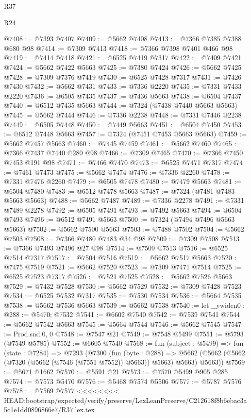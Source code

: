 \begin{lexlean}{R37}
\begin{lexlean}{R24}
\begin{coremodule}
{{{{{{{{{{{{{{{{{{{{{{{{{{{{{{{{{{{{{{{{{{{{{{{{{{{{{{{{{{{{{{{{{{{{{{{{{{{{{{{{{{{{{{{{{{{{{{{{{{{{{{{{{{{{{{{{{{{{{{{{{{{{{{{{{{{{{{{{{{{{{{{{{{{{{{{{{{{{{{{{{{{{{{{{{{{{{{{{{{{{{{{{{@7408 := @7393 @7407
@7409 := @5662 @7408
@7413 := @7366 @7385 @7388 @680 @98
@7414 := @7309 @7413
@7418 := @7366 @7398 @7401 @466 @98
@7419 := @7414 @7418
@7421 := @6525 @7419 @7317
@7422 := @7409 @7421
@7424 := @5662 @7422 @5663
@7425 := @7380 @7424
@7426 := @5662 @7425
@7428 := @7309 @7376 @7419
@7430 := @6525 @7428 @7317
@7431 := @7426 @7430
@7432 := @5662 @7431
@7433 := @7336 @2220
@7435 := @7331 @7433 @2220
@7436 := @6505 @7435
@7437 := @7436 @5663
@7438 := @6504 @7437
@7440 := @6512 @7435 @5663
@7444 := @7324 (@7438 @7440 @5663 @5663)
@7445 := @5662 @7444
@7446 := @7336 @2238
@7448 := @7331 @7446 @2238
@7449 := @6505 @7448
@7450 := @7449 @5663
@7451 := @6504 @7450
@7453 := @6512 @7448 @5663
@7457 := @7324 (@7451 @7453 @5663 @5663)
@7459 := @5662 @7457 @5663
@7460 := @7445 @7459
@7461 := @5662 @7460
@7465 := @7366 @7437 @7440 @280 @98
@7466 := @7309 @7465
@7470 := @7366 @7450 @7453 @191 @98
@7471 := @7466 @7470
@7473 := @6525 @7471 @7317
@7474 := @7461 @7473
@7475 := @5662 @7474
@7476 := @7336 @2260
@7478 := @7331 @7476 @2260
@7479 := @6505 @7478
@7480 := @7479 @5663
@7481 := @6504 @7480
@7483 := @6512 @7478 @5663
@7487 := @7324 (@7481 @7483 @5663 @5663)
@7488 := @5662 @7487
@7489 := @7336 @2278
@7491 := @7331 @7489 @2278
@7492 := @6505 @7491
@7493 := @7492 @5663
@7494 := @6504 @7493
@7496 := @6512 @7491 @5663
@7500 := @7324 (@7494 @7496 @5663 @5663)
@7502 := @5662 @7500 @5663
@7503 := @7488 @7502
@7504 := @5662 @7503
@7508 := @7366 @7480 @7483 @34 @98
@7509 := @7309 @7508
@7513 := @7366 @7493 @7496 @27 @98
@7514 := @7509 @7513
@7516 := @6525 @7514 @7317
@7517 := @7504 @7516
@7519 := @5662 @7517 @5663
@7520 := @7475 @7519
@7521 := @5662 @7520
@7523 := @7309 @7471 @7514
@7525 := @6525 @7523 @7317
@7526 := @7521 @7525
@7528 := @5662 @7526 @5663
@7529 := @7432 @7528
@7530 := @5662 @7529
@7532 := @7309 @7428 @7523
@7534 := @6525 @7532 @7317
@7535 := @7530 @7534
@7536 := @5664 @7535
@7538 := @5662 @7536 @5663
@7539 := @5662 @7538
@7540 := let _ywiden0 : @288 := @5470; @7532
@7541 := @6602 @7540
@7542 := @7539 @7541
@7544 := @5662 @7542 @5663
@7545 := @5664 @7544
@7546 := @5662 @7545
@7547 := Prod.snd.{0, 0}
@7548 := @7547 @21
@7549 := @7548 @5499
@7551 := @5793 (@7549 @5785)
@7552 := @6605 @7540
@7568 := fun (subject : @5499) =>
  fun (state : @7284) =>
  @7293
    (@7300
      (fun (byte : @288) =>
      @5662 (@5662 (@5662 (@7320 (@5662 (@7546 (@7551 @7552)) @5663)) @5663) @5663) @5663))
@7569 := @5671 @1662
@7570 := @5591 @21
@7573 := @7570 @5499 @905 @285
@7574 := @7573 @5470
@7576 := @5468 @7574 @5506
@7577 := @5787 @7576
@7578 := @7569 @7577
<<<<<<<< HEAD:bootstrap/expected/verify/preserve/LexLeanPreserve/C212618f8b6ebac3a5c1e1dd0896866e7/R37.lex.tex
}}}}}}}}}}}}}}}}}}}}}}}}}}}}}}}}}}}}}}}}}}}}}}}}}}}}}}}}}}}}}}}}}}}}}}}}}}}}}}}}}}}}}}}}}}}}}}}}}}}}}}}}}}}}}}}}}}}}}}}}}}}}}}}}}}}}}}}}}}}}}}}}}}}}}}}}}}}}}}}}}}}}}}}}}}}}}}}}}}}}}}}}}
\end{coremodule}
\end{lexlean}
\end{lexlean}
